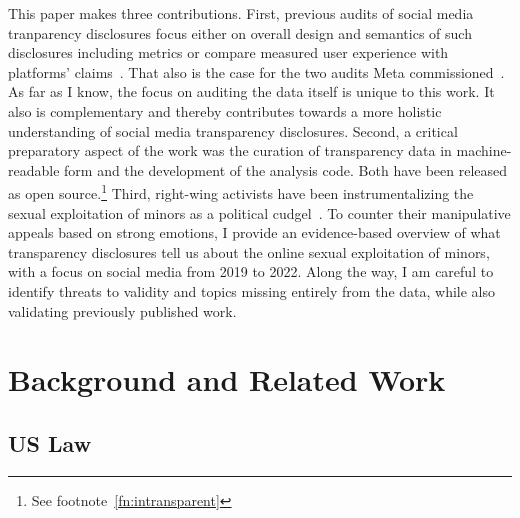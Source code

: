 \documentclass[nonacm,screen]{acmart}
\newcommand\V[1]{\textsc{\MakeLowercase{#1}}}
\newcommand\hidden[1]{}
\begin{document}
This paper makes three contributions. First, previous audits of social media
tranparency disclosures focus either on overall design and semantics of such
disclosures including metrics or compare measured user experience with
platforms' claims~\cite{AccessNow2021,CrockerGebhartea2019,Francoisdouek2021,
StoughtonRosenzweig2022,WagnerRozgonyiea2020}. That also is the case for the two
audits Meta commissioned~\cite{BradfordGriselea2019,Plumb2019,Sarang2022}. As
far as I know, the focus on auditing the data itself is unique to this work. It
also is complementary and thereby contributes towards a more holistic
understanding of social media transparency disclosures. Second, a critical
preparatory aspect of the work was the curation of transparency data in
machine-readable form and the development of the analysis code. Both have been
released as open source.\footnote{See footnote~\ref{fn:intransparent}} Third,
right-wing activists have been instrumentalizing the sexual exploitation of
minors as a political
cudgel~\cite{BuntainBarlowea2022,Feffer2021,Gilbert2023,Romano2022}. To counter
their manipulative appeals based on strong emotions, I provide an evidence-based
overview of what transparency disclosures tell us about the online sexual
exploitation of minors, with a focus on social media from 2019 to 2022. Along
the way, I am careful to identify threats to validity and topics missing
entirely from the data, while also validating previously published work.

\hidden{
I discuss legal background and related work in Section~\ref{sec:background}.
Next, I introduce surveyed platforms and then present my audit findings in
Section~\ref{sec:audits}. I present the evidence-based overview of the spread of
\V{CSAM} across the internet in Section~\ref{sec:global-spread}. Finally, I
discuss the results in Section~\ref{sec:discussion} and conclude with
Section~\ref{sec:outlook}.
}



\section{Background and Related Work}
\label{sec:background}

\subsection{US Law}
\end{document}
